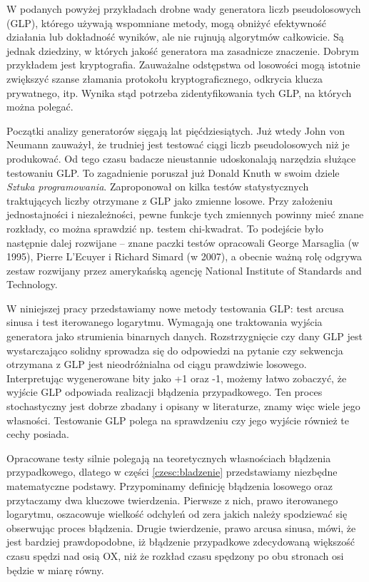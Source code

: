 \documentclass[a4paper,11pt,twoside]{book}
\theoremstyle{definition}
\begin{document}
W podanych powyżej przykładach drobne wady generatora liczb pseudolosowych (GLP), którego używają wspomniane metody, mogą obniżyć efektywność działania lub dokładność wyników, ale nie rujnują algorytmów całkowicie. Są jednak dziedziny, w których jakość generatora ma zasadnicze znaczenie. Dobrym przykładem jest kryptografia. Zauważalne odstępstwa od losowości mogą istotnie zwiększyć szanse złamania protokołu kryptograficznego, odkrycia klucza prywatnego, itp. Wynika stąd potrzeba zidentyfikowania tych GLP, na których można polegać.

Początki analizy generatorów sięgają lat pięćdziesiątych. Już wtedy John von Neumann zauważył, że trudniej jest testować ciągi liczb pseudolosowych niż je produkować. Od tego czasu badacze nieustannie udoskonalają narzędzia służące testowaniu GLP. To zagadnienie poruszał już Donald Knuth w swoim dziele \emph{Sztuka programowania}. Zaproponował on kilka testów statystycznych traktujących liczby otrzymane z GLP jako zmienne losowe. Przy założeniu jednostajności i niezależności, pewne funkcje tych zmiennych powinny mieć znane rozkłady, co można sprawdzić np. testem chi-kwadrat. To podejście było następnie dalej rozwijane -- znane paczki testów opracowali George Marsaglia (w 1995), Pierre L’Ecuyer i Richard Simard (w 2007), a obecnie ważną rolę odgrywa zestaw rozwijany przez amerykańską agencję National Institute of Standards and Technology.

W niniejszej pracy przedstawiamy nowe metody testowania GLP: test arcusa sinusa i test iterowanego logarytmu. Wymagają one traktowania wyjścia generatora jako strumienia binarnych danych. Rozstrzygnięcie czy dany GLP jest wystarczająco solidny sprowadza się do odpowiedzi na pytanie czy sekwencja otrzymana z GLP jest nieodróżnialna od ciągu prawdziwie losowego. Interpretując wygenerowane bity jako +1 oraz -1, możemy łatwo zobaczyć, że wyjście GLP odpowiada realizacji błądzenia przypadkowego. Ten proces stochastyczny jest dobrze zbadany i opisany w literaturze, znamy więc wiele jego własności. Testowanie GLP polega na sprawdzeniu czy jego wyjście również te cechy posiada.

Opracowane testy silnie polegają na teoretycznych własnościach błądzenia przypadkowego, dlatego w części \ref{czesc:bladzenie} przedstawiamy niezbędne matematyczne podstawy. Przypominamy definicję błądzenia losowego oraz przytaczamy dwa kluczowe twierdzenia. Pierwsze z nich, prawo iterowanego logarytmu, oszacowuje wielkość odchyleń od zera jakich należy spodziewać się obserwując proces błądzenia. Drugie twierdzenie, prawo arcusa sinusa, mówi, że jest bardziej prawdopodobne, iż błądzenie przypadkowe zdecydowaną większość czasu spędzi nad osią OX, niż że rozkład czasu spędzony po obu stronach osi będzie w miarę równy.
\end{document}
